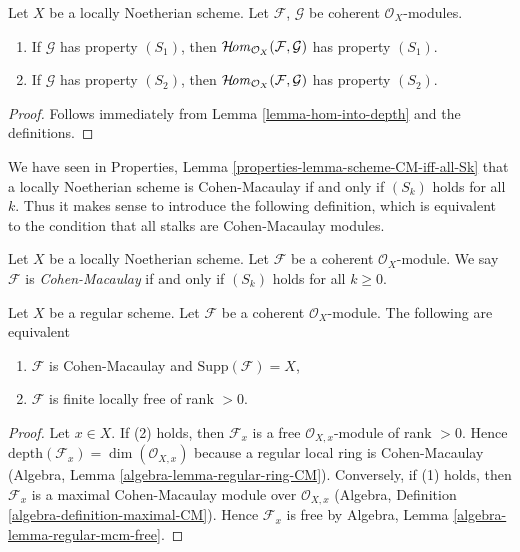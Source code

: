 \begin{lemma}
\label{lemma-hom-into-S2}
Let $X$ be a locally Noetherian scheme. Let $\mathcal{F}$, $\mathcal{G}$
be coherent $\mathcal{O}_X$-modules.
\begin{enumerate}
\item If $\mathcal{G}$ has property $(S_1)$, then
$\mathop{\mathcal{H}\!\mathit{om}}\nolimits_{\mathcal{O}_X}(\mathcal{F}, \mathcal{G})$ has property $(S_1)$.
\item If $\mathcal{G}$ has property $(S_2)$, then
$\mathop{\mathcal{H}\!\mathit{om}}\nolimits_{\mathcal{O}_X}(\mathcal{F}, \mathcal{G})$ has property $(S_2)$.
\end{enumerate}
\end{lemma}

\begin{proof}
Follows immediately from Lemma \ref{lemma-hom-into-depth}
and the definitions.
\end{proof}

\noindent
We have seen in Properties, Lemma \ref{properties-lemma-scheme-CM-iff-all-Sk}
that a locally Noetherian
scheme is Cohen-Macaulay if and only if $(S_k)$ holds for all $k$.
Thus it makes sense to introduce the following definition, which
is equivalent to the condition that all stalks are Cohen-Macaulay modules.

\begin{definition}
\label{definition-Cohen-Macaulay}
Let $X$ be a locally Noetherian scheme.
Let $\mathcal{F}$ be a coherent $\mathcal{O}_X$-module.
We say $\mathcal{F}$ is {\it Cohen-Macaulay} if and only
if $(S_k)$ holds for all $k \geq 0$.
\end{definition}

\begin{lemma}
\label{lemma-Cohen-Macaulay-over-regular}
Let $X$ be a regular scheme. Let $\mathcal{F}$ be a coherent
$\mathcal{O}_X$-module. The following are equivalent
\begin{enumerate}
\item $\mathcal{F}$ is Cohen-Macaulay and $\text{Supp}(\mathcal{F}) = X$,
\item $\mathcal{F}$ is finite locally free of rank $> 0$.
\end{enumerate}
\end{lemma}

\begin{proof}
Let $x \in X$. If (2) holds, then $\mathcal{F}_x$ is a free
$\mathcal{O}_{X, x}$-module of rank $> 0$. Hence
$\text{depth}(\mathcal{F}_x) = \dim(\mathcal{O}_{X, x})$
because a regular local ring is Cohen-Macaulay
(Algebra, Lemma \ref{algebra-lemma-regular-ring-CM}).
Conversely, if (1) holds, then $\mathcal{F}_x$ is a
maximal Cohen-Macaulay module over $\mathcal{O}_{X, x}$
(Algebra, Definition \ref{algebra-definition-maximal-CM}).
Hence $\mathcal{F}_x$ is free by
Algebra, Lemma \ref{algebra-lemma-regular-mcm-free}.
\end{proof}









